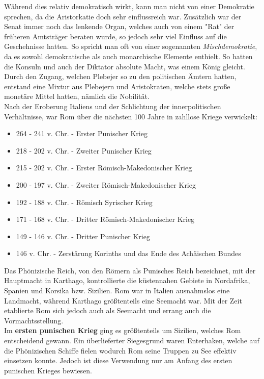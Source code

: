 \documentclass{article}
\begin{document}
	Während dies relativ demokratisch wirkt, kann man nicht von einer Demokratie sprechen, da die Aristorkatie doch sehr einflussreich war. Zusätzlich war der Senat immer noch das lenkende Organ, welches auch von einem "Rat" der früheren Amtsträger beraten wurde, so jedoch sehr viel Einfluss auf die Geschehnisse hatten. So spricht man oft von einer sogenannten \textit{Mischdemokratie}, da es sowohl demokratische als auch monarchische Elemente enthielt. So hatten die Konsuln und auch der Diktator absolute Macht, was einem König gleicht. \\
	Durch den Zugang, welchen Plebejer so zu den politischen Ämtern hatten, entstand eine Mixtur aus Plebejern und Aristokraten, welche stets große monetäre Mittel hatten, nämlich die Nobilität. \\
	Nach der Eroberung Italiens und der Schlichtung der innerpolitischen Verhältnisse, war Rom über die nächsten 100 Jahre in zahllose Kriege verwickelt:
	\begin{itemize}
		\item{264 - 241 v. Chr. - Erster Punischer Krieg}
		\item{218 - 202 v. Chr. - Zweiter Punischer Krieg}
		\item{215 - 202 v. Chr. - Erster Römisch-Makedonischer Krieg}
		\item{200 - 197 v. Chr. - Zweiter Römisch-Makedonischer Krieg}
		\item{192 - 188 v. Chr. - Römisch Syrischer Krieg}
		\item{171 - 168 v. Chr. - Dritter Römisch-Makedonischer Krieg}
		\item{149 - 146 v. Chr. - Dritter Punischer Krieg}
		\item{146 v. Chr. - Zerstärung Korinths und das Ende des Achäischen Bundes}
	\end{itemize}
	Das Phönizische Reich, von den Römern als Punisches Reich bezeichnet, mit der Hauptmacht in Karthago, kontrollierte die küstennahen Gebiete in Nordafrika, Spanien und Korsika bzw. Sizilien. Rom war in Italien ausnahmslos eine Landmacht, während Karthago größtenteils eine Seemacht war. Mit der Zeit etablierte Rom sich jedoch auch als Seemacht und errang auch die Vormachtsstellung. \\
	Im \textbf{ersten punischen Krieg} ging es größtenteils um Sizilien, welches Rom entscheidend gewann. Ein überlieferter Siegesgrund waren Enterhaken, welche auf die Phönizischen Schiffe fielen wodurch Rom seine Truppen zu See effektiv einsetzen konnte. Jedoch ist diese Verwendung nur am Anfang des ersten punischen Krieges bewiesen.\\
\end{document}
